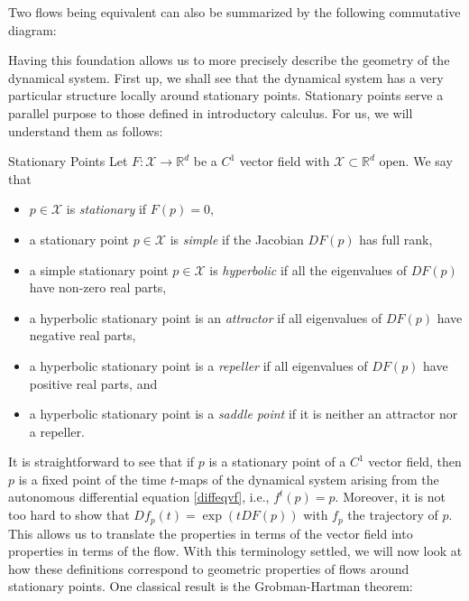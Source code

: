 \documentclass[11pt, a4paper]{memoir}
\theoremstyle{break}
\theoremstyle{break}
\theoremstyle{nonumberplain}
\newcommand{\mR}{\mathbb{R}}
\begin{document}
\noindent Two flows being equivalent can also be summarized by the following commutative diagram:
\begin{center}
\end{center}
Having this foundation allows us to more precisely describe the geometry of the dynamical system. First up, we shall see that the dynamical system has a very particular structure locally around stationary points. Stationary points serve a parallel purpose to those defined in introductory calculus. For us, we will understand them as follows:
\begin{mydefinition}{Stationary Points}
Let $F:\mathcal{X}\to \mR^d$ be a $C^1$ vector field with $\mathcal{X}\subset \mR^d$ open. We say that
\begin{itemize}
	\item $p\in \mathcal{X}$ is \emph{stationary} if $F(p)=0$,
	\item a stationary point $p\in \mathcal{X}$ is \emph{simple} if the Jacobian $DF(p)$ has full rank,
	\item a simple stationary point $p\in \mathcal{X}$ is \emph{hyperbolic} if all the eigenvalues of $DF(p)$ have non-zero real parts,
	\item a hyperbolic stationary point is an \emph{attractor} if all eigenvalues of $DF(p)$ have negative real parts,
	\item a hyperbolic stationary point is a \emph{repeller} if all eigenvalues of $DF(p)$ have positive real parts, and
	\item a hyperbolic stationary point is a \emph{saddle point} if it is neither an attractor nor a repeller.	
\end{itemize}
\end{mydefinition}
It is straightforward to see that if $p$ is a stationary point of a $C^1$ vector field, then $p$ is a fixed point of the time $t$-maps of the dynamical system arising from the autonomous differential equation \ref{diffeqvf}, i.e., $f^t(p)=p$. Moreover, it is not too hard to show that $Df_p(t)=\exp(tDF(p))$ with $f_p$ the trajectory of $p$. This allows us to translate the properties in terms of the vector field into properties in terms of the flow. With this terminology settled, we will now look at how these definitions correspond to geometric properties of flows around stationary points. One classical result is the Grobman-Hartman theorem:
\end{document}
